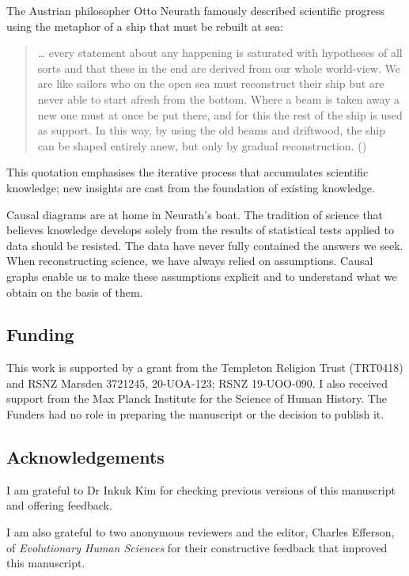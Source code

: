 \documentclass[
  single column]{article}
\begin{document}
The Austrian philosopher Otto Neurath famously described scientific
progress using the metaphor of a ship that must be rebuilt at sea:

\begin{quote}
\ldots{} every statement about any happening is saturated with
hypotheses of all sorts and that these in the end are derived from our
whole world-view. We are like sailors who on the open sea must
reconstruct their ship but are never able to start afresh from the
bottom. Where a beam is taken away a new one must at once be put there,
and for this the rest of the ship is used as support. In this way, by
using the old beams and driftwood, the ship can be shaped entirely anew,
but only by gradual reconstruction. ()
\end{quote}

This quotation emphasises the iterative process that accumulates
scientific knowledge; new insights are cast from the foundation of
existing knowledge.

Causal diagrams are at home in Neurath's boat. The tradition of science
that believes knowledge develops solely from the results of statistical
tests applied to data should be resisted. The data have never fully
contained the answers we seek. When reconstructing science, we have
always relied on assumptions. Causal graphs enable us to make these
assumptions explicit and to understand what we obtain on the basis of
them.

\newpage{}

\subsection{Funding}\label{funding}

This work is supported by a grant from the Templeton Religion Trust
(TRT0418) and RSNZ Marsden 3721245, 20-UOA-123; RSNZ 19-UOO-090. I also
received support from the Max Planck Institute for the Science of Human
History. The Funders had no role in preparing the manuscript or the
decision to publish it.

\subsection{Acknowledgements}\label{acknowledgements}

I am grateful to Dr Inkuk Kim for checking previous versions of this
manuscript and offering feedback.

I am also grateful to two anonymous reviewers and the editor, Charles
Efferson, of \emph{Evolutionary Human Sciences} for their constructive
feedback that improved this manuscript.
\end{document}
